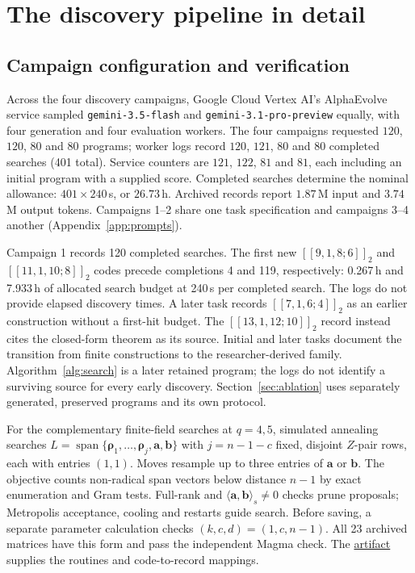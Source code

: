 \documentclass{article}
\newcommand{\artifactlink}{\href{https://github.com/LeGenAI/llm_guided_EAQECC_search/tree/arxiv-v1}{artifact}}
\newcommand{\vct}[1]{\boldsymbol{#1}} %
\begin{document}
\section{The discovery pipeline in detail}\label{app:pipeline-detail}

\subsection{Campaign configuration and verification}\label{app:campaign}
Across the four discovery campaigns, Google Cloud Vertex AI's
AlphaEvolve service sampled
\texttt{gemini-3.5-flash} and \texttt{gemini-3.1-pro-preview} equally,
with four generation and four evaluation workers. The four campaigns
requested $120$, $120$, $80$ and $80$ programs; worker logs record
$120$, $121$, $80$ and $80$ completed searches (401 total). Service
counters are $121$, $122$, $81$ and $81$, each including an initial
program with a supplied score. Completed searches determine the nominal
allowance: $401\times240$\,s, or $26.73$\,h. Archived records report
$1.87$\,M input and $3.74$\,M output tokens. Campaigns 1--2 share one
task specification and campaigns 3--4 another (Appendix~\ref{app:prompts}).

Campaign 1 records 120 completed searches. The first new
$[[9,1,8;6]]_2$ and $[[11,1,10;8]]_2$ codes precede completions 4
and 119, respectively: 0.267\,h and 7.933\,h of allocated
search budget at 240\,s per completed search. The logs do not provide
elapsed discovery times. A later task records $[[7,1,6;4]]_2$ as an
earlier construction without a first-hit budget. The $[[13,1,12;10]]_2$
record instead cites the closed-form theorem as its source.
Initial and later tasks document the transition from finite constructions
to the researcher-derived family. Algorithm~\ref{alg:search} is a later
retained program; the logs do not identify a surviving source for every
early discovery. Section~\ref{sec:ablation} uses separately generated,
preserved programs and its own protocol.

For the complementary finite-field searches at $q=4,5$,
simulated annealing searches\label{app:nonbinary-search}
$L=\operatorname{span}\{\vct\rho_1,\ldots,\vct\rho_j,\vct a,\vct b\}$
with $j=n-1-c$ fixed, disjoint $Z$-pair rows, each with entries $(1,1)$.
Moves resample up to three entries of $\vct a$ or $\vct b$.
The objective counts non-radical span vectors below distance $n-1$ by
exact enumeration and Gram tests. Full-rank and
$\langle\vct a,\vct b\rangle_s\ne0$ checks prune proposals; Metropolis acceptance, cooling and restarts guide search.
Before saving, a separate parameter calculation checks $(k,c,d)=(1,c,n-1)$.
All 23 archived matrices have this form and pass the independent Magma
check. The \artifactlink{} supplies the routines and code-to-record mappings.
\end{document}
